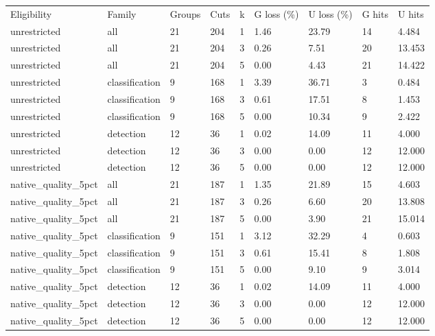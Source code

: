 \begin{tabular}{lllllllll}
Eligibility & Family & Groups & Cuts & k & G loss (\%) & U loss (\%) & G hits & U hits \\
unrestricted & all & 21 & 204 & 1 & 1.46 & 23.79 & 14 & 4.484 \\
unrestricted & all & 21 & 204 & 3 & 0.26 & 7.51 & 20 & 13.453 \\
unrestricted & all & 21 & 204 & 5 & 0.00 & 4.43 & 21 & 14.422 \\
unrestricted & classification & 9 & 168 & 1 & 3.39 & 36.71 & 3 & 0.484 \\
unrestricted & classification & 9 & 168 & 3 & 0.61 & 17.51 & 8 & 1.453 \\
unrestricted & classification & 9 & 168 & 5 & 0.00 & 10.34 & 9 & 2.422 \\
unrestricted & detection & 12 & 36 & 1 & 0.02 & 14.09 & 11 & 4.000 \\
unrestricted & detection & 12 & 36 & 3 & 0.00 & 0.00 & 12 & 12.000 \\
unrestricted & detection & 12 & 36 & 5 & 0.00 & 0.00 & 12 & 12.000 \\
native\_quality\_5pct & all & 21 & 187 & 1 & 1.35 & 21.89 & 15 & 4.603 \\
native\_quality\_5pct & all & 21 & 187 & 3 & 0.26 & 6.60 & 20 & 13.808 \\
native\_quality\_5pct & all & 21 & 187 & 5 & 0.00 & 3.90 & 21 & 15.014 \\
native\_quality\_5pct & classification & 9 & 151 & 1 & 3.12 & 32.29 & 4 & 0.603 \\
native\_quality\_5pct & classification & 9 & 151 & 3 & 0.61 & 15.41 & 8 & 1.808 \\
native\_quality\_5pct & classification & 9 & 151 & 5 & 0.00 & 9.10 & 9 & 3.014 \\
native\_quality\_5pct & detection & 12 & 36 & 1 & 0.02 & 14.09 & 11 & 4.000 \\
native\_quality\_5pct & detection & 12 & 36 & 3 & 0.00 & 0.00 & 12 & 12.000 \\
native\_quality\_5pct & detection & 12 & 36 & 5 & 0.00 & 0.00 & 12 & 12.000 \\
\end{tabular}
